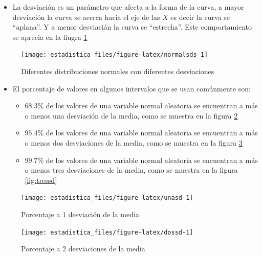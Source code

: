 \documentclass[]{book}
\providecommand{\tightlist}{%
  \setlength{\itemsep}{0pt}\setlength{\parskip}{0pt}}
\begin{document}
\begin{itemize}
\tightlist
\item
  La desviación es un parámetro que afecta a la forma de la curva, a mayor desviación la curva se acerca hacia el eje de las \(X\) es decir la curva se ``aplana''. Y a menor desviación la curva se ``estrecha''. Este comportamiento se aprecia en la fiugra \ref{fig:normalsds}
\end{itemize}

\begin{figure}[h]

{\centering \texttt{[image: estadistica\_files/figure-latex/normalsds-1]} 

}

\caption{Diferentes distribuciones normales con diferentes desviaciones}\label{fig:normalsds}
\end{figure}

\begin{itemize}
\tightlist
\item
  El porcentaje de valores en algunos intervalos que se usan comúnmente son:

  \begin{itemize}
  \tightlist
  \item
    \(68.3\%\) de los valores de una variable normal aleatoria se encuentran a más o menos una desviación de la media, como se muestra en la figura \ref{fig:unasd}
  \item
    \(95.4\%\) de los valores de una variable normal aleatoria se encuentran a más o menos dos desviaciones de la media, como se muestra en la figura \ref{fig:dossd}
  \item
    \(99.7\%\) de los valores de una variable normal aleatoria se encuentran a más o menos tres desviaciones de la media, como se muestra en la figura \ref{fig:tressd}
  \end{itemize}
\end{itemize}

\begin{figure}[h]

{\centering \texttt{[image: estadistica\_files/figure-latex/unasd-1]} 

}

\caption{Porcentaje a 1 desviación de la media}\label{fig:unasd}
\end{figure}

\begin{figure}[h]

{\centering \texttt{[image: estadistica\_files/figure-latex/dossd-1]} 

}

\caption{Porcentaje a 2 desviaciones de la media}\label{fig:dossd}
\end{figure}
\end{document}
